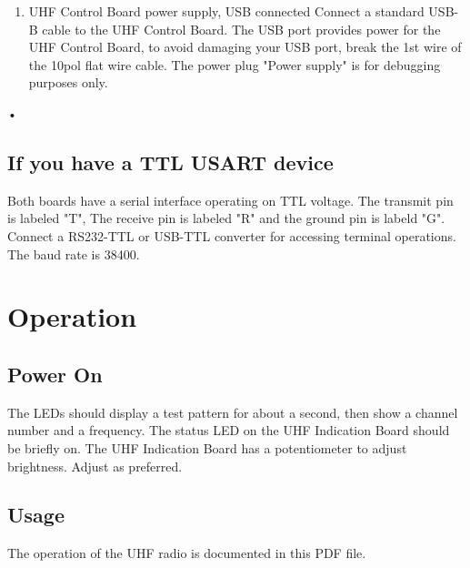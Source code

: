 \documentclass[12pt, a4paper]{report}
\begin{document}
\begin{enumerate}

\item
UHF Control Board power supply, USB connected
Connect a standard USB-B cable to the UHF Control Board.
The USB port provides power for the UHF Control Board, to avoid damaging your USB port, break the 1st wire of the 10pol flat wire cable. The power plug "Power supply" is for debugging purposes only.

\end{enumerate}•

\section{If you have a TTL USART device}
Both boards have a serial interface operating on TTL voltage. The transmit pin is labeled "T", The receive pin is labeled "R" and the ground pin is labeld "G". Connect a RS232-TTL or USB-TTL converter for accessing terminal operations. The baud rate is 38400.

\chapter{Operation}
\section{Power On}
The LEDs should display a test pattern for about a second, then show a channel number and a frequency.
The status LED on the UHF Indication Board should be briefly on.
The UHF Indication Board has a potentiometer to adjust brightness. Adjust as preferred.

\section {Usage}
The operation of the UHF radio is documented in this PDF file.
\end{document}
